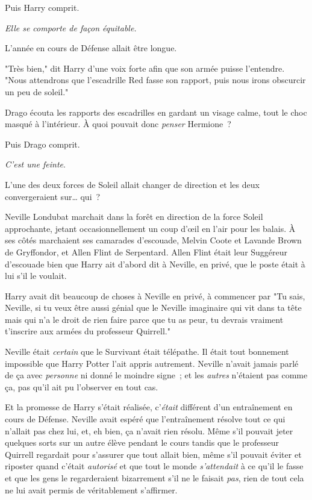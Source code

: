 Puis Harry comprit.

\emph{Elle se comporte de façon équitable.}

L'année en cours de Défense allait être longue.

"Très bien," dit Harry d'une voix forte afin que son armée puisse l'entendre. "Nous attendrons que l'escadrille Red fasse son rapport, puis nous irons obscurcir un peu de soleil."

\later

Drago écouta les rapports des escadrilles en gardant un visage calme, tout le choc masqué à l'intérieur. À quoi pouvait donc \emph{penser} Hermione~?

Puis Drago comprit.

\emph{C'est une feinte}.

L'une des deux forces de Soleil allait changer de direction et les deux convergeraient sur… qui~?

\later

Neville Londubat marchait dans la forêt en direction de la force Soleil approchante, jetant occasionnellement un coup d'œil en l'air pour les balais. À ses côtés marchaient ses camarades d'escouade, Melvin Coote et Lavande Brown de Gryffondor, et Allen Flint de Serpentard. Allen Flint était leur Suggéreur d'escouade bien que Harry ait d'abord dit à Neville, en privé, que le poste était à lui s'il le voulait.

Harry avait dit beaucoup de choses à Neville en privé, à commencer par "Tu sais, Neville, si tu veux être aussi génial que le Neville imaginaire qui vit dans ta tête mais qui n'a le droit de rien faire parce que tu as peur, tu devrais vraiment t'inscrire aux armées du professeur Quirrell."

Neville était \emph{certain} que le Survivant était télépathe. Il était tout bonnement impossible que Harry Potter l'ait appris autrement. Neville n'avait jamais parlé de ça avec \emph{personne} ni donné le moindre signe~; et les \emph{autres} n'étaient pas comme ça, pas qu'il ait pu l'observer en tout cas.

Et la promesse de Harry s'était réalisée, c'\emph{était} différent d'un entraînement en cours de Défense. Neville avait espéré que l'entraînement résolve tout ce qui n'allait pas chez lui, et, eh bien, ça n'avait rien résolu. Même s'il pouvait jeter quelques sorts sur un autre élève pendant le cours tandis que le professeur Quirrell regardait pour s'assurer que tout allait bien, même s'il pouvait éviter et riposter quand c'était \emph{autorisé} et que tout le monde \emph{s'attendait} à ce qu'il le fasse et que les gens le regarderaient bizarrement s'il ne le faisait \emph{pas}, rien de tout cela ne lui avait permis de véritablement s'affirmer.

